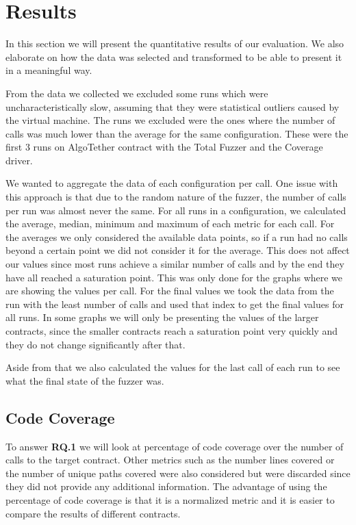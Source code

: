 \section{Results} \label{section:results}
In this section we will present the quantitative results of our evaluation.
We also elaborate on how the data was selected and transformed to be able to present it in a meaningful way.

From the data we collected we excluded some runs which were uncharacteristically slow, assuming that they were statistical outliers caused by the virtual machine.
The runs we excluded were the ones where the number of calls was much lower than the average for the same configuration.
These were the first 3 runs on AlgoTether contract with the Total Fuzzer and the Coverage driver.

We wanted to aggregate the data of each configuration per call.
One issue with this approach is that due to the random nature of the fuzzer, the number of calls per run was almost never the same.
For all runs in a configuration, we calculated the average, median, minimum and maximum of each metric for each call.
For the averages we only considered the available data points, so if a run had no calls beyond a certain point we did not consider it for the average.
This does not affect our values since most runs achieve a similar number of calls and by the end they have all reached a saturation point.
This was only done for the graphs where we are showing the values per call.
For the final values we took the data from the run with the least number of calls and used that index to get the final values for all runs.
In some graphs we will only be presenting the values of the larger contracts, since the smaller contracts reach a saturation point very quickly and they do not change significantly after that.

Aside from that we also calculated the values for the last call of each run to see what the final state of the fuzzer was.

\subsection*{Code Coverage}
To answer \textbf{RQ.1} we will look at percentage of code coverage over the number of calls to the target contract.
Other metrics such as the number lines covered or the number of unique paths covered were also considered but were discarded since they did not provide any additional information.
The advantage of using the percentage of code coverage is that it is a normalized metric and it is easier to compare the results of different contracts.


